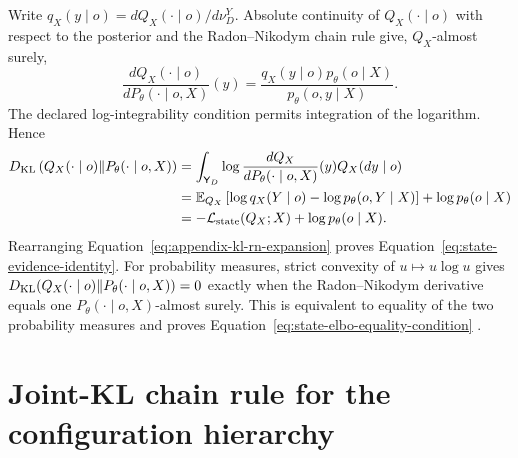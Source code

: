 Write \(q_X(y\mid o)=dQ_X(\mathord\cdot\mid o)/d\nu_D^Y\). Absolute continuity of \(Q_X(\mathord\cdot\mid o)\) with respect to the posterior and the Radon--Nikodym chain rule give, \(Q_X\)-almost surely,
\begin{equation}
\frac{dQ_X(\mathord\cdot\mid o)}
{dP_\theta(\mathord\cdot\mid o,X)}(y)
=\frac{q_X(y\mid o)p_\theta(o\mid X)}
{p_\theta(o,y\mid X)}.
\label{eq:appendix-radon-nikodym-ratio}
\end{equation}
The declared log-integrability condition permits integration of the logarithm. Hence
\begin{align}
D_{\mathrm{KL}}\left(
Q_X(\mathord\cdot\mid o)
\middle\Vert
P_\theta(\mathord\cdot\mid o,X)
\right)
&=\int_{\mathsf Y_D}
\log\frac{dQ_X}{dP_\theta(\mathord\cdot\mid o,X)}(y)
Q_X(dy\mid o)
\label{eq:appendix-kl-rn-expansion}\\
&=\mathbb E_{Q_X}\left[
\log q_X(Y\mid o)-\log p_\theta(o,Y\mid X)
\right]
+\log p_\theta(o\mid X)\notag\\
&=-\mathcal L_{\mathrm{state}}(Q_X;X)+\log p_\theta(o\mid X).\notag
\end{align}
Rearranging Equation~\eqref{eq:appendix-kl-rn-expansion} proves Equation~\eqref{eq:state-evidence-identity}. For probability measures, strict convexity of \(u\mapsto u\log u\) gives
\(D_{\mathrm{KL}}(Q_X(\mathord\cdot\mid o)\Vert P_\theta(\mathord\cdot\mid o,X))=0\) exactly when the Radon--Nikodym derivative equals one \(P_\theta(\mathord\cdot\mid o,X)\)-almost surely. This is equivalent to equality of the two probability measures and proves Equation~\eqref{eq:state-elbo-equality-condition} \citep{Kullback1951,Csiszar1967}.

\section{Joint-KL chain rule for the configuration hierarchy}
\label{sec:hierarchical-joint-kl-proof}


